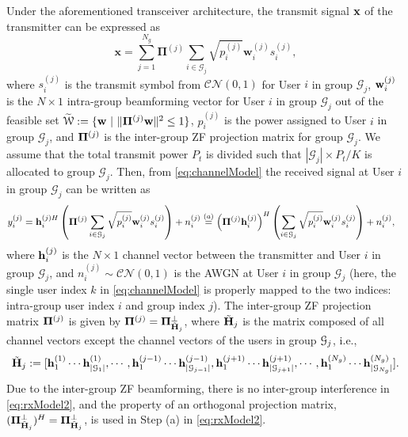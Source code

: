 \documentclass[11pt, draft, onecolumn ]{IEEEtran}
\begin{document}
Under the aforementioned transceiver architecture, the transmit signal ${\bf x}$ of the transmitter  can be expressed as
\begin{equation}
 \mathbf{x} = \sum_{j=1}^{N_g} \mathbf{\Pi}^{(j)}\sum_{i \in \mathcal{G}_j}\sqrt{p_i^{(j)}} \mathbf{w}_i^{(j)}
    s_i^{(j)}, \label{eq:new_arch}
\end{equation}
where $s_i^{(j)}$ is the transmit symbol from  $\mathcal{CN}(0,1)$
for User $i$ in group $\mathcal{G}_j$, ${\bf w}_i^{(j)}$ is the $N \times 1$ intra-group beamforming vector for User $i$ in group
$\mathcal{G}_j$ out of the feasible set $\widetilde{\mathcal{W}} := \{ {\bf w} ~|~ \| \mathbf{\Pi}^{(j)} {\bf w}\|^2 \leq 1\}$, $p_i^{(j)}$ is the power
assigned to User $i$ in group $\mathcal{G}_j$, and ${\bf \Pi}^{(j)}$ is the inter-group ZF projection matrix for
group $\mathcal{G}_j$.  We assume that the total transmit power $P_t$ is divided such that $|\mathcal{G}_j| \times P_t/K$ is allocated to group $\mathcal{G}_j$. Then, from
 \eqref{eq:channelModel}
 the received signal at User $i$ in group $\mathcal{G}_j$ can be written as
\begin{align}
    y_i^{(j)} &= {\bf h}_i^{(j)H} \left({\bf \Pi}^{(j)} \sum_{i \in \mathcal{G}_j}\sqrt{p_i^{(j)}} \mathbf{w}_i^{(j)}
    s_i^{(j)}\right) + n_i^{(j)} \stackrel{(a)}{=}  \left({\bf \Pi}^{(j)}{\bf h}_i^{(j)}\right)^H \left(\sum_{i \in \mathcal{G}_j}\sqrt{p_i^{(j)}} \mathbf{w}_i^{(j)}
    s_i^{(j)}\right) + n_i^{(j)}, \label{eq:rxModel2}
\end{align}
where ${\bf h}_i^{(j)}$ is  the $N \times 1$ channel vector between the transmitter and User $i$ in group $\mathcal{G}_j$, and
$n_i^{(j)}\sim \mathcal{CN}(0,1)$ is the AWGN at User $i$ in group $\mathcal{G}_j$ (here, the single user index $k$ in  \eqref{eq:channelModel} is properly mapped to the two indices: intra-group user index $i$ and group index $j$).  The inter-group ZF projection matrix ${\bf \Pi}^{(j)}$ is given by
${\bf \Pi}^{(j)} = {\bf \Pi}_{\tilde{{\bf H}}_j}^\bot$,
where  $\tilde{{\bf H}}_j$ is the matrix composed of all channel vectors except the channel vectors of the users in group ${\cal G}_j$, i.e.,
\begin{equation}  \label{eq:tildeHbfj}
\tilde{{\bf H}}_j:= [{\bf h}_1^{(1)} \cdots {\bf h}_{|\mathcal{G}_1|}^{(1)} , \cdots, {\bf h}_1^{(j-1)} \cdots {\bf h}_{|\mathcal{G}_{j-1}|}^{(j-1) }, {\bf h}_1^{(j+1)} \cdots {\bf h}_{|\mathcal{G}_{j+1}|}^{(j+1) } , \cdots, {\bf h}_1^{(N_g)} \cdots {\bf h}_{|\mathcal{G}_{N_g}|}^{(N_g) }  ].
\end{equation}
Due to the inter-group ZF beamforming, there is no inter-group interference in \eqref{eq:rxModel2}, and the property of an orthogonal projection matrix, $({\bf \Pi}_{\tilde{{\bf H}}_j}^\bot)^H={\bf \Pi}_{\tilde{{\bf H}}_j}^\bot$, is used in Step (a) in \eqref{eq:rxModel2}.
\end{document}
